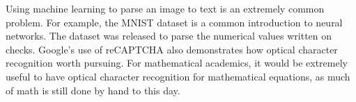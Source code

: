 \documentclass[../proposal.tex]{subfiles}
\begin{document}
Using machine learning to parse an image to text is an extremely common problem.
For example, the MNIST dataset is a common introduction to neural networks. \cite*{lecun2010_MNIST}
The dataset was released to parse the numerical values written on checks.
Google's use of reCAPTCHA also demonstrates how optical character recognition worth pursuing. \cite*{Ahn_2008_reCAPTCHA}
For mathematical academics, it would be extremely useful to have optical character recognition for mathematical equations, as much of math is still done by hand to this day.
\end{document}
